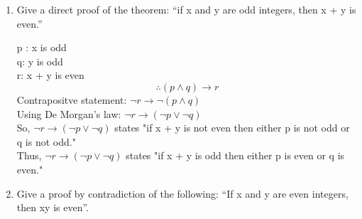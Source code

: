 \documentclass[12pt]{article}
\begin{document}
\begin{enumerate}[leftmargin=\labelsep]
\item Give a direct proof of the theorem: “if x and y are odd integers, then x + y is even.”
    \begin{center}
        p : x is odd \\
        q: y is odd \\
        r: x + y is even 
    \begin{equation*}
        \therefore \left(p \wedge q\right) \to r
    \end{equation*}
    Contrapositve statement: $\lnot r \to \lnot\left(p \wedge q \right)$ \\
    Using De Morgan's law: $\lnot r \to \left(\lnot p \vee \lnot q \right)$ \\
    So, $\lnot r \to \left(\lnot p \vee \lnot q \right)$ states "if x + y is not even then either p is not odd or q is not odd." \\
    Thus, $\lnot r \to \left(\lnot p \vee \lnot q \right)$ states "if x + y is odd then either p is even or q is even."
\end{center}  
\item Give a proof by contradiction of the following: “If x and y are even integers, then
xy is even”.

\end{enumerate}
\end{document}
